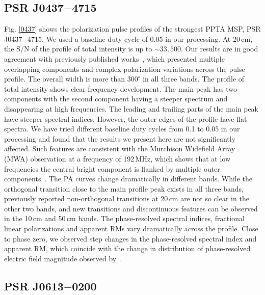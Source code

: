 \documentclass[useAMS,usenatbib]{mn2e}
\begin{document}
\subsection{PSR J0437$-$4715}

Fig. \ref{0437} shows the polarization pulse profiles of the strongest PPTA 
MSP, PSR J0437$-$4715.
%
We used a baseline duty cycle of 0.05 in our processing.
%
At 20\,cm, the S/N of the profile of total intensity is up to $\sim33,500$. 
Our results are in good agreement with previously published works~\citep{Johnston93,Manchester95_1,Navarro97,Yan11}, 
which presented multiple overlapping components and complex polarization 
variations across the pulse profile. 
%
The overall width is more than $300^{\circ}$ in all three bands.
%
The profile of total intensity shows clear frequency development.  
%
The main peak has two components with the second component having a steeper 
spectrum and disappearing at high frequencies. The leading and trailing 
parts of the main peak have steeper spectral indices.
%
However, the outer edges of the profile have flat spectra. We have tried 
different baseline duty cycles from 0.1 to 0.05 in our processing and found 
that the results we present here are not significantly affected.
%
Such features are consistent with the Murchison Widefield Array (MWA) 
observation at a frequency of 192\,MHz, which shows that at low frequencies 
the central bright component is flanked by multiple outer components~\citep{Bhat14}.
%
The PA curves change dramatically in different bands. While the orthogonal 
transition close to the main profile peak exists in all three bands, previously
reported non-orthogonal transitions at 20\,cm are not so clear in the other two bands,
and new transitions and discontinuous features can be observed in the 10\,cm 
and 50\,cm bands.
%
The phase-resolved spectral indices, fractional linear polarizations and apparent 
RMs vary dramatically across the profile.
%
Close to phase zero, we observed step changes in the phase-resolved spectral index and 
apparent RM, which coincide with the change in distribution of phase-resolved electric 
field magnitude observed by~\citet{Oslowski14}.

\subsection{PSR J0613$-$0200}
\end{document}
